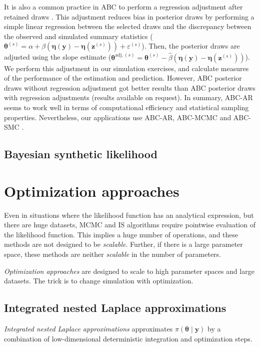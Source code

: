 It is also a common practice in ABC to perform a regression adjustment after retained draws \cite{beaumont2002approximate,leuenberger2010bayesian, sisson2018handbook}. This adjustment reduces bias in posterior draws by performing a simple linear regression between the selected draws and the discrepancy between the observed and simulated summary statistics ($\boldsymbol{\theta}^{(s)} = \alpha + \beta \left(\boldsymbol{\eta}(\boldsymbol{y}) - \boldsymbol{\eta}(\boldsymbol{z}^{(s)})\right) + \varepsilon^{(s)}$). Then, the posterior draws are adjusted using the slope estimate ($\boldsymbol{\theta}^{\text{adj},(s)} = \boldsymbol{\theta}^{(s)} - \hat{\beta} \left(\boldsymbol{\eta}(\boldsymbol{y}) - \boldsymbol{\eta}(\boldsymbol{z}^{(s)})\right)$). We perform this adjustment in our simulation exercises, and calculate measures of the performance of the estimation and prediction. However, ABC posterior draws without regression adjustment got better results than ABC posterior draws with regression adjustments (results available on request). In summary, ABC-AR seems to work well in terms of computational efficiency and statistical sampling properties. Nevertheless, our applications use ABC-AR, ABC-MCMC \cite{marjoram2003markov} and ABC-SMC \cite{lenormand2013adaptive}. 


\subsection{Bayesian synthetic likelihood}\label{sec15_13}

\section{Optimization approaches}\label{sec15_2}

Even in situations where the likelihood function has an analytical expression, but there are huge datasets, MCMC and IS algorithms require pointwise evaluation of the likelihood function. This implies a huge number of operations, and these methods are not designed to be \textit{scalable}. Further, if there is a large parameter space, these methods are neither \textit{scalable} in the number of parameters.

\textit{Optimization approaches} are designed to scale to high parameter spaces and large datasets. The trick is to change simulation with optimization. 

\subsection{Integrated nested Laplace approximations}\label{sec15_21}
\textit{Integrated nested Laplace approximations} approximates $\pi(\boldsymbol{\theta} \mid \mathbf{y})$ by a combination of low-dimensional deterministic integration and optimization steps. 

